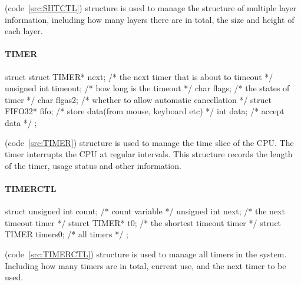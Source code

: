 \documentclass{swfcthesis}
\begin{document}
(code~\ref{src:SHTCTL}) structure is used to manage the structure of multiple layer information,
including how many layers there are in total, the size and height of each layer.



\paragraph{TIMER}

\begin{listing}[H]
  \begin{codeblock}
\begin{ccode}
struct 
{ 
  struct TIMER* next;   /* the next timer that is about to timeout */
  unsigned int timeout; /* how long is the timeout */
  char flags;           /* the states of timer */
  char flgas2;          /* whether to allow automatic cancellation */
  struct FIFO32* fifo;  /* store data(from mouse, keyboard etc) */
  int data;             /* accept data */
};
\end{ccode}
  \end{codeblock}
  \caption{\emph{struct TIMER}}\label{src:TIMER}
\end{listing}

(code~\ref{src:TIMER}) structure is used to manage the time slice of the CPU. The timer
interrupts the CPU at regular intervals. This structure records the length of the timer,
usage status and other information.



\paragraph{TIMERCTL}

\begin{listing}[H]
  \begin{codeblock}
\begin{ccode}
struct 
{ 
  unsigned int count;   /* count variable */
  unsigned int next;    /* the next timeout timer */
  sturct TIMER* t0;     /* the shortest timeout timer */
  struct TIMER timers0; /* all timers */
};
\end{ccode}
  \end{codeblock}
  \caption{\emph{struct TIMERCTL}}\label{src:TIMERCTL}
\end{listing}

(code~\ref{src:TIMERCTL}) structure is used to manage all timers in the system. Including
how many timers are in total, current use, and the next timer to be used.
\end{document}
